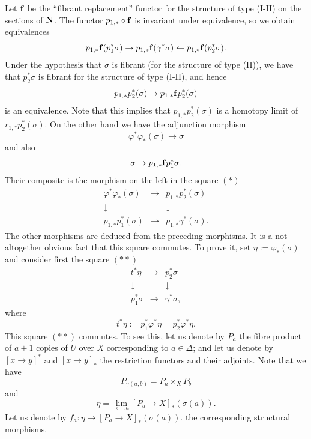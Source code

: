 Let ${\bf f}$ be the ``fibrant replacement'' functor for the structure
of type (I-II) on the sections of ${\bf N}$. The functor
$p _{1,\ast} \circ {\bf f}$ is invariant under equivalence, so we
obtain equivalences
$$
p _{1,\ast} {\bf f}(p_1^{\ast} \sigma )\rightarrow
p _{1,\ast} {\bf f}(\gamma ^{\ast}\sigma ) \leftarrow
p _{1,\ast} {\bf f}(p_2^{\ast} \sigma ).
$$
Under the hypothesis that $\sigma$ is fibrant (for the structure of
type (II)), we
have that $p_2^{\ast}\sigma$ is fibrant for the structure of type (I-II),
and hence
$$
p _{1,\ast}p_2^{\ast} (\sigma )
\rightarrow
p _{1,\ast} {\bf f}p_2^{\ast} (\sigma )
$$
is an equivalence.
Note that this implies that $p _{1,\ast}p_2^{\ast} (\sigma )$ is a
homotopy limit of $r_{1,\ast}p_2^{\ast} (\sigma )$.
On the other hand we have the adjunction morphism
$$
\varphi ^{\ast} \varphi _{\ast} (\sigma )
\rightarrow \sigma
$$
and also
$$
\sigma \rightarrow p _{1,\ast} {\bf f} p_1^{\ast} \sigma .
$$
Their composite is the morphism
on the left in the square $(\ast )$
$$
\begin{array}{ccc}
\varphi ^{\ast} \varphi _{\ast} (\sigma )&\rightarrow &
p _{1,\ast} p_2^{\ast} (\sigma )\\
\downarrow && \downarrow \\
p _{1,\ast} p_1^{\ast} (\sigma )&\rightarrow &
p _{1,\ast} \gamma ^{\ast}(\sigma ).
\end{array}
$$
The other morphisms are deduced from the preceding morphisms.
It is a not altogether obvious fact that this square commutes.
To prove it, set $\eta :=  \varphi _{\ast} (\sigma )$
and consider
first the square $(\ast \ast )$
$$
\begin{array}{ccc}
t^{\ast} \eta & \rightarrow & p _2^{\ast} \sigma \\
\downarrow && \downarrow \\
p_1^{\ast} \sigma & \rightarrow & \gamma ^{\ast} \sigma ,
\end{array}
$$
where
$$
t^{\ast} \eta := p_1^{\ast} \varphi ^{\ast} \eta = p_2^{\ast} \varphi
^{\ast} \eta .
$$
This square $(\ast \ast )$ commutes. To see this, let us denote by $P_a$ the
fibre product of $a+1$ copies of $U$ over $X$ corresponding to
$a\in \Delta$; and let us denote by $[x\rightarrow y]^{\ast} $ and $[x\rightarrow
y]_{\ast}$ the restriction functors and their adjoints. Note that we have
$$
P_{\gamma (a,b)} = P_a\times _XP_b
$$
and
$$
\eta = \lim _{\leftarrow , a} [P_a\rightarrow X]_{\ast}(\sigma (a)).
$$
Let us denote by $
f_a: \eta \rightarrow [P_a\rightarrow X]_{\ast}(\sigma (a)).
$ the corresponding structural morphisms.

